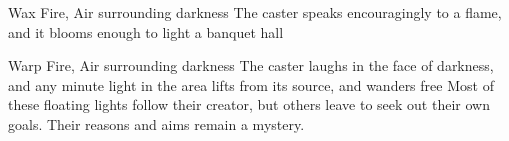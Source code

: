   {}%
  {Wax}%
  {Fire, Air}%
  {surrounding darkness}%
  {The caster speaks encouragingly to a flame, and it blooms enough to light a banquet hall}%
  {}

  {}%
  {Warp}%
  {Fire, Air}%
  {surrounding darkness}%
  {The caster laughs in the face of darkness, and any minute light in the area lifts from its source, and wanders free}%
  {Most of these floating lights follow their creator, but others leave to seek out their own goals.
  Their reasons and aims remain a mystery.}

